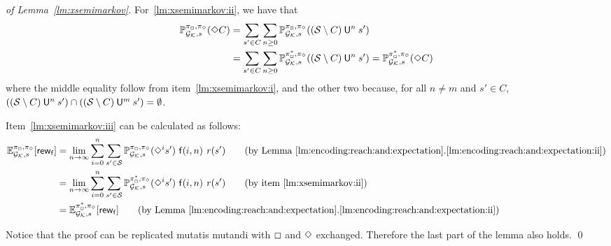 \begin{proof}[of Lemma~\ref{lm:xsemimarkov}]
  For~\ref{lm:xsemimarkov:ii}, we have that
  \begin{align*}
    \mathbb{P}^{\pi_{{\Box}},\pi_{{\Diamond}}}_{{\mathcal{G}_{\mathcal{K}}},s}(\Diamond C)
    & =
    \sum_{s'\in C}\sum_{n\geq0}\mathbb{P}^{\pi_{{\Box}},\pi_{{\Diamond}}}_{{\mathcal{G}_{\mathcal{K}}},s}((\mathcal{S}\setminus C) \mathbin{\mathsf{U}}^n s')
    \\
    & =
    \sum_{s'\in C}\sum_{n\geq0}\mathbb{P}^{\pi^*_{{\Box}},\pi_{{\Diamond}}}_{{\mathcal{G}_{\mathcal{K}}},s}((\mathcal{S}\setminus C) \mathbin{\mathsf{U}}^n s')
    =
    \mathbb{P}^{\pi^*_{{\Box}},\pi_{{\Diamond}}}_{{\mathcal{G}_{\mathcal{K}}},s}(\Diamond C)
  \end{align*}
  where the middle equality follow from item~\ref{lm:xsemimarkov:i},
  and the other two because, for all $n\neq m$ and $s'\in C$,
  $((\mathcal{S}\setminus C) \mathbin{\mathsf{U}}^n s') \cap ((\mathcal{S}\setminus C) \mathbin{\mathsf{U}}^m s') = \emptyset$.

  \medskip

  Item~\ref{lm:xsemimarkov:iii} can be calculated as follows:
  \begin{align*}
    \Expect^{\strat_{\maxplay},\strat_{\minplay}}_{\StochGK,s}[\GRewards]
    & =
    \lim_{n\to\infty} \sum^{n}_{i=0} \sum_{s' \in \sgnodes} \Prob^{\strat_{\maxplay},\strat_{\minplay}}_{\StochGK,s}(\Finally^i s')\mult\fgen(i,n)\mult\reward(s') 
    \tag{by Lemma~\ref{lm:encoding:reach:and:expectation}.\ref{lm:encoding:reach:and:expectation:ii}}\\
    & =
    \lim_{n\to\infty} \sum^{n}_{i=0} \sum_{s' \in \sgnodes} \Prob^{\starredstrat_{\maxplay},\strat_{\minplay}}_{\StochGK,s}(\Finally^i s')\mult\fgen(i,n)\mult\reward(s') 
    \tag{by item~\ref{lm:xsemimarkov:ii}}\\
    & =
    \Expect^{\starredstrat_{\maxplay},\strat_{\minplay}}_{\StochGK,s}[\GRewards]
    \tag{by Lemma~\ref{lm:encoding:reach:and:expectation}.\ref{lm:encoding:reach:and:expectation:ii}}
  \end{align*}

  \medskip
  
  Notice that the proof can be replicated mutatis mutandi with
  ${\Box}$ and ${\Diamond}$ exchanged.  Therefore the last part of the
  lemma also holds.
\qed
\end{proof}


